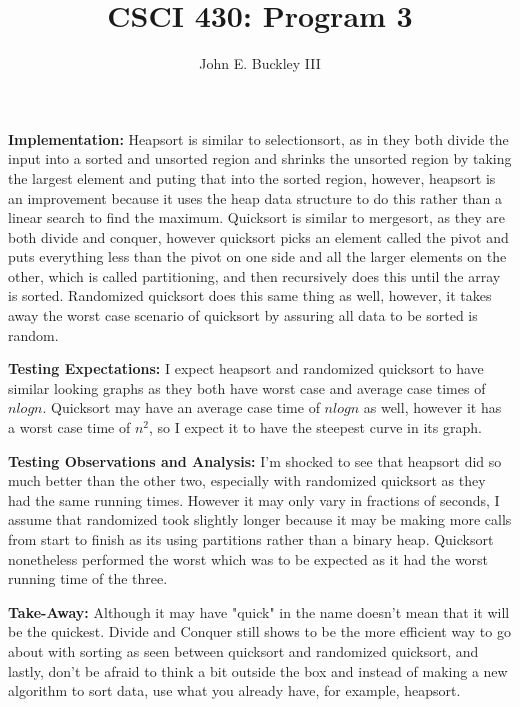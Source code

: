 \documentclass[12pt]{article}
\author{John E. Buckley III}
\title{CSCI 430: Program 3}
\newcommand\tab[1][1cm]{\hspace*{#1}}
\begin{document}
\maketitle

\textbf{Implementation:} \newline
\tab Heapsort is similar to selectionsort, as in they both divide the input into a sorted and unsorted region and shrinks the unsorted region by taking the largest element and puting that into the sorted region, however, heapsort is an improvement because it uses the heap data structure to do this rather than a linear search to find the maximum. Quicksort is similar to mergesort, as they are both divide and conquer, however quicksort picks an element called the pivot and puts everything less than the pivot on one side and all the larger elements on the other, which is called partitioning, and then recursively does this until the array is sorted. Randomized quicksort does this same thing as well, however, it takes away the worst case scenario of quicksort by assuring all data to be sorted is random. \newline \newline

\textbf{Testing Expectations:} \newline
\tab I expect heapsort and randomized quicksort to have similar looking graphs as they both have worst case and average case times of $nlogn$. Quicksort may have an average case time of $nlogn$ as well, however it has a worst case time of $n^2$, so I expect it to have the steepest curve in its graph. \newline \newline

\textbf{Testing Observations and Analysis:} \newline
\tab I'm shocked to see that heapsort did so much better than the other two, especially with randomized quicksort as they had the same running times. However it may only vary in fractions of seconds, I assume that randomized took slightly longer because it may be making more calls from start to finish as its using partitions rather than a binary heap. Quicksort nonetheless performed the worst which was to be expected as it had the worst running time of the three.\newline \newline

\textbf{ Take-Away:} \newline
\tab Although it may have "quick" in the name doesn't mean that it will be the quickest. Divide and Conquer still shows to be the more efficient way to go about with sorting as seen between quicksort and randomized quicksort, and lastly, don't be afraid to think a bit outside the box and instead of making a new algorithm to sort data, use what you already have, for example, heapsort.
\end{document}
